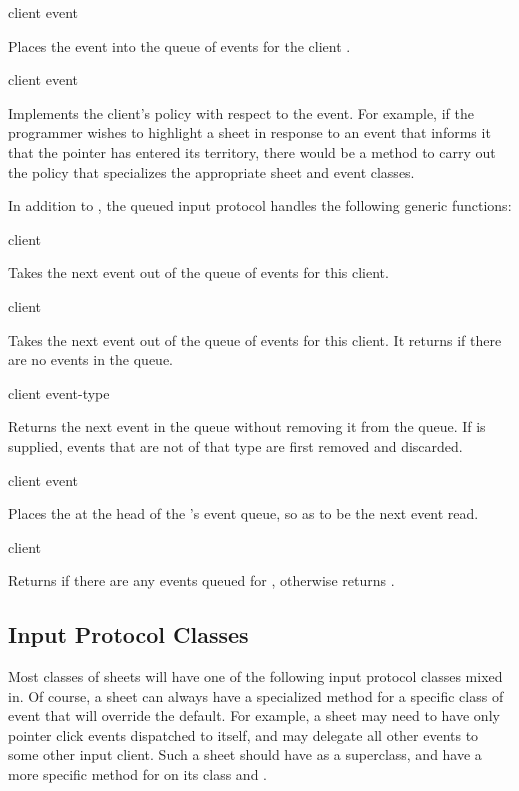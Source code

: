  {client event}

Places the event  into the queue of events for the client .

 {client event}

Implements the client's policy with respect to the event.  For example, if the
programmer wishes to highlight a sheet in response to an event that informs it
that the pointer has entered its territory, there would be a method to carry out
the policy that specializes the appropriate sheet and event classes.

In addition to , the queued input protocol handles the following
generic functions:

 {client}

Takes the next event out of the queue of events for this client.

 {client}

Takes the next event out of the queue of events for this client.  It returns
 if there are no events in the queue.

 {client \optional event-type}

Returns the next event in the queue without removing it from the queue.  If
 is supplied, events that are not of that type are first
removed and discarded.

 {client event}

Places the  at the head of the 's event queue, so as to
be the next event read.

 {client}

Returns  if there are any events queued for , otherwise
returns .


\subsection {Input Protocol Classes}

Most classes of sheets will have one of the following input protocol classes
mixed in.  Of course, a sheet can always have a specialized method for a
specific class of event that will override the default.  For example, a sheet
may need to have only pointer click events dispatched to itself, and may
delegate all other events to some other input client.  Such a sheet should have
 as a superclass, and have a more specific method
for  on its class and .

